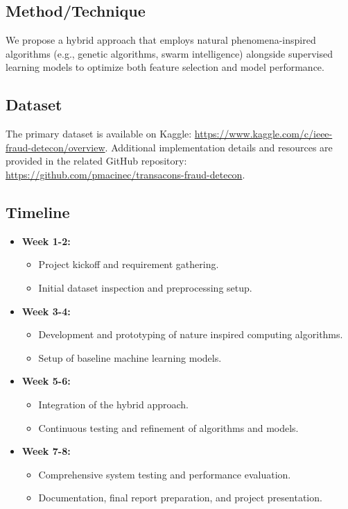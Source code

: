 \documentclass[conference]{IEEEtran}
\begin{document}
\subsection{Method/Technique}
We propose a hybrid approach that employs natural phenomena-inspired algorithms (e.g., genetic algorithms, swarm intelligence) alongside supervised learning models to optimize both feature selection and model performance.

\subsection{Dataset}
The primary dataset is available on Kaggle: \href{https://www.kaggle.com/c/ieee-fraud-detecon/overview}{https://www.kaggle.com/c/ieee-fraud-detecon/overview}. Additional implementation details and resources are provided in the related GitHub repository: \href{https://github.com/pmacinec/transacons-fraud-detecon}{https://github.com/pmacinec/transacons-fraud-detecon}.

\subsection{Timeline}
\begin{itemize}
    \item \textbf{Week 1-2:} 
    \begin{itemize}
        \item Project kickoff and requirement gathering.
        \item Initial dataset inspection and preprocessing setup.
    \end{itemize}
    \item \textbf{Week 3-4:} 
    \begin{itemize}
        \item Development and prototyping of nature inspired computing algorithms.
        \item Setup of baseline machine learning models.
    \end{itemize}
    \item \textbf{Week 5-6:} 
    \begin{itemize}
        \item Integration of the hybrid approach.
        \item Continuous testing and refinement of algorithms and models.
    \end{itemize}
    \item \textbf{Week 7-8:} 
    \begin{itemize}
        \item Comprehensive system testing and performance evaluation.
        \item Documentation, final report preparation, and project presentation.
    \end{itemize}
\end{itemize}
\end{document}
